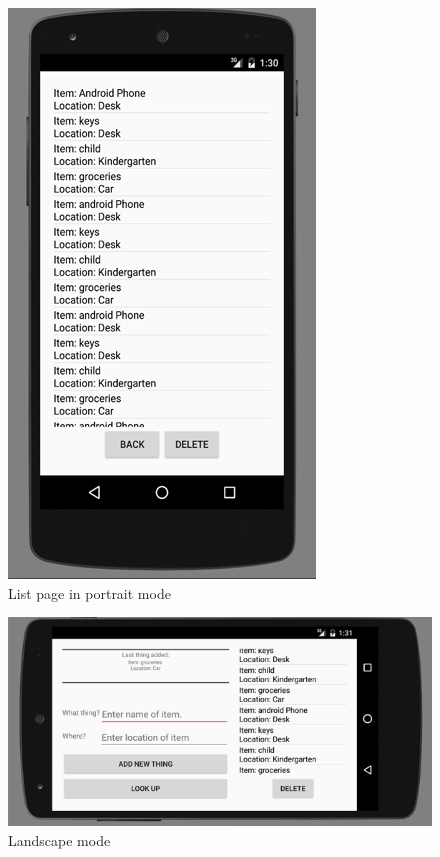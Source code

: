 \documentclass{article}
\begin{document}
\begin{figure}[h]
	\centering
	\includegraphics[scale=0.7]{"listPortrait"}
	\caption{List page in portrait mode}
	\label{fig:listPortrait}
\end{figure}

\begin{figure}[h!]
	\centering
	\includegraphics[scale=0.7]{"landscapeMode"}
	\caption{Landscape mode}
	\label{fig:landscapeMode}
\end{figure}
\end{document}
